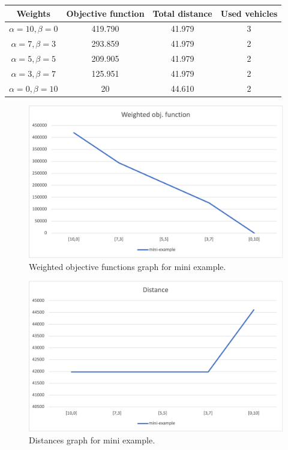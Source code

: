 {
\renewcommand{\arraystretch}{2}
\begin{longtable}[h]{| c | c | c | c |}
    \hline
    \textbf{Weights} & \textbf{Objective function} & \textbf{Total distance} & \textbf{Used vehicles} \\
    \hline
    \endhead
    $\alpha = 10, \beta = 0$ & 419.790 & 41.979 & 3 \\
    \hline
    $\alpha = 7, \beta = 3$  & 293.859 & 41.979 & 2 \\
    \hline
    $\alpha = 5, \beta = 5$  & 209.905 & 41.979 & 2 \\
    \hline
    $\alpha = 3, \beta = 7$  & 125.951 & 41.979 & 2 \\
    \hline
    $\alpha = 0, \beta = 10$ &      20 & 44.610 & 2 \\
    \hline
\end{longtable}
}
\begin{figure}[H]
    \centering
    \includegraphics[width=1.0\columnwidth]{../graphs/mini-example-wobjf.png}
    \caption{Weighted objective functions graph for mini example.}
\end{figure}

\begin{figure}[H]
    \centering
    \includegraphics[width=1.0\columnwidth]{../graphs/mini-example-distance.png}
    \caption{Distances graph for mini example.}
\end{figure}

